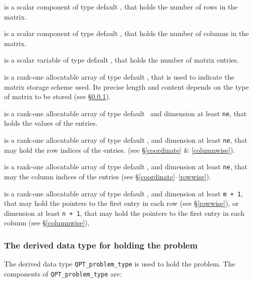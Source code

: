 \documentclass{galahad}
\begin{document}
\begin{description}

 is a scalar component of type default \integer,
that holds the number of rows in the matrix.

 is a scalar component of type default \integer,
that holds the number of columns in the matrix.

 is a scalar variable of type default \integer, that
holds the number of matrix entries.

 is a rank-one allocatable array of type default \character, that
is used to indicate the matrix storage scheme used. Its precise length and
content depends on the type of matrix to be stored (see \S\ref{typeprob}).

 is a rank-one allocatable array of type default \realdp\,
and dimension at least {\tt ne}, that holds the values of the entries.

 is a rank-one allocatable array of type default \integer,
and dimension at least {\tt ne}, that may hold the row indices of the entries.
(see \S\ref{coordinate} \& \ref{columnwise}).

 is a rank-one allocatable array of type default \integer,
and dimension at least {\tt ne}, that may the column indices of the entries
(see \S\ref{coordinate}--\ref{rowwise}).

 is a rank-one allocatable array of type default \integer,
and dimension at least {\tt m + 1}, that may hold the pointers to
the first entry in each row (see \S\ref{rowwise}),
or dimension at least {\tt n + 1}, that may hold the pointers to
the first entry in each column (see \S\ref{columnwise}),

\end{description}


\subsubsection{The derived data type for holding the problem}\label{typeprob}
The derived data type {\tt QPT\_problem\_type} is used to hold
the problem. The components of
{\tt QPT\_problem\_type}
are:
\end{document}
